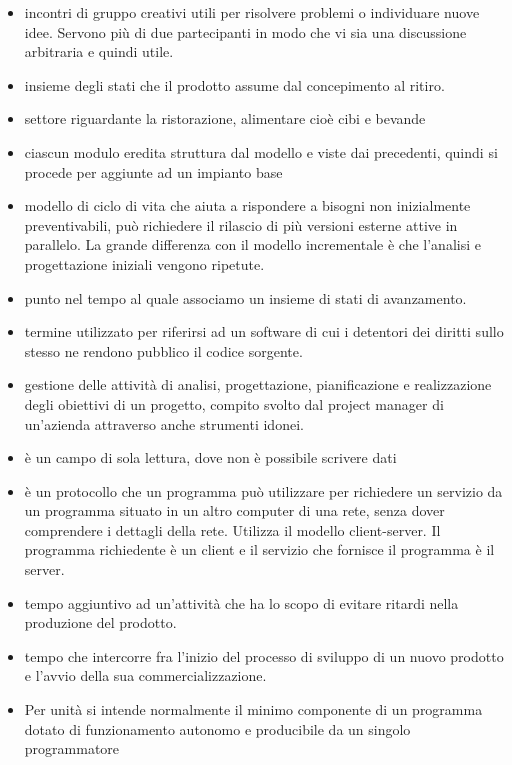 
\begin{itemize} 

	\item {} incontri di gruppo creativi utili per risolvere problemi o individuare nuove idee. Servono più di due partecipanti in modo che vi sia una discussione arbitraria e quindi utile.
	\item {} insieme degli stati che il prodotto assume dal concepimento al ritiro.
	\item {} settore riguardante la ristorazione, alimentare cioè cibi e bevande
	\item  {} ciascun modulo eredita struttura dal modello e viste dai precedenti, quindi si procede per aggiunte ad un impianto base
	\item {} modello di ciclo di vita che aiuta a rispondere a bisogni non inizialmente preventivabili, può richiedere il rilascio di più versioni esterne attive in parallelo. La grande differenza con il modello incrementale è che l'analisi e progettazione iniziali vengono ripetute.
	\item {} punto nel tempo al quale associamo un insieme di stati di avanzamento.
	\item {} termine utilizzato per riferirsi ad un software di cui i detentori dei diritti sullo stesso ne rendono pubblico il codice sorgente.
	\item {} gestione delle attività di analisi, progettazione, pianificazione e realizzazione degli obiettivi di un progetto, compito svolto dal project manager di un'azienda attraverso anche strumenti idonei.
	\item {} è un campo di sola lettura, dove non è possibile scrivere dati
	\item {} è un  protocollo  che un programma può utilizzare per richiedere un servizio da un programma situato in un altro computer di una rete, senza dover comprendere i dettagli della rete. Utilizza il   modello client-server. Il programma richiedente è un client e il servizio che fornisce il programma è il server.
	\item {} tempo aggiuntivo ad un'attività che ha lo scopo di evitare ritardi nella produzione del prodotto.
	\item {} tempo che intercorre fra l’inizio del processo di sviluppo di un nuovo prodotto e l’avvio della sua commercializzazione.
	\item {} Per unità si intende normalmente il minimo componente di un programma dotato di funzionamento autonomo e producibile da un singolo programmatore

\end{itemize} 
